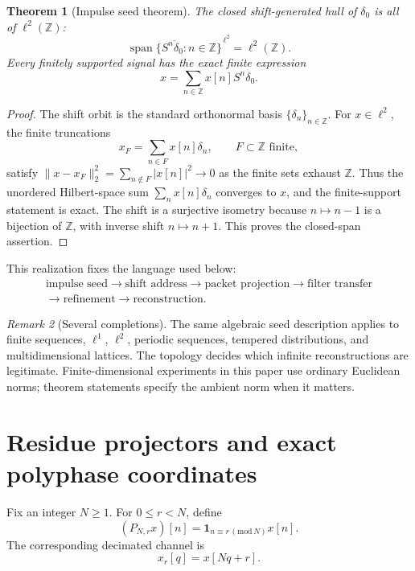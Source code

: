 \documentclass[11pt,a4paper]{article}
\newtheorem{theorem}{Theorem}[section]
\theoremstyle{definition}
\theoremstyle{remark}
\newtheorem{remark}[theorem]{Remark}
\newcommand{\bbZ}{\mathbb Z}
\begin{document}
\begin{theorem}[Impulse seed theorem]\label{result:01}
The closed shift-generated hull of $\delta_0$ is all of $\ell^2(\bbZ)$:
\[
\boxed{
\overline{\operatorname{span}\{S^n\delta_0:n\in\bbZ\}}^{\,\ell^2}
=\ell^2(\bbZ).
}
\]
Every finitely supported signal has the exact finite expression
\[
x=\sum_{n\in\bbZ}x[n]S^n\delta_0.
\]
\end{theorem}

\begin{proof}
The shift orbit is the standard orthonormal basis $\{\delta_n\}_{n\in\bbZ}$. For $x\in\ell^2$, the finite truncations
\[
x_F=\sum_{n\in F}x[n]\delta_n,\qquad F\subset\bbZ\text{ finite},
\]
satisfy $\|x-x_F\|_2^2=\sum_{n\notin F}|x[n]|^2\to0$ as the finite sets exhaust $\bbZ$. Thus the unordered Hilbert-space sum $\sum_nx[n]\delta_n$ converges to $x$, and the finite-support statement is exact. The shift is a surjective isometry because $n\mapsto n-1$ is a bijection of $\bbZ$, with inverse shift $n\mapsto n+1$. This proves the closed-span assertion.
\end{proof}

This realization fixes the language used below:
\[
\begin{gathered}
\text{impulse seed}\longrightarrow\text{shift address}\longrightarrow\text{packet projection}\longrightarrow\text{filter transfer}\\
\longrightarrow\text{refinement}\longrightarrow\text{reconstruction}.
\end{gathered}
\]

\begin{remark}[Several completions]\label{core:record:02}
The same algebraic seed description applies to finite sequences, $\ell^1$, $\ell^2$, periodic sequences, tempered distributions, and multidimensional lattices. The topology decides which infinite reconstructions are legitimate. Finite-dimensional experiments in this paper use ordinary Euclidean norms; theorem statements specify the ambient norm when it matters.
\end{remark}

\section{Residue projectors and exact polyphase coordinates}\label{core:section:02}

Fix an integer $N\ge1$. For $0\le r<N$, define
\[
(P_{N,r}x)[n]
=
\mathbf 1_{n\equiv r\, (\mathrm{mod}\,N)}x[n].
\]
The corresponding decimated channel is
\[
x_r[q]=x[Nq+r].
\]
\end{document}

